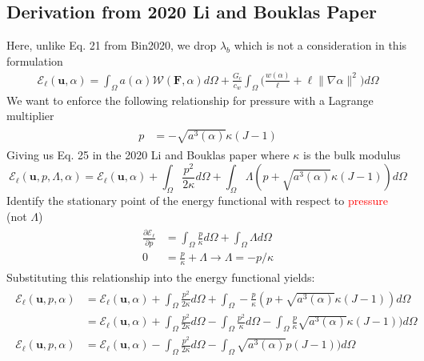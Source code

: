 \documentclass[12pt,3p]{article}
\numberwithin{equation}{section}
\begin{document}
\subsection{Derivation from 2020 Li and Bouklas Paper}
Here, unlike Eq. 21 from Bin2020, we drop $\lambda_b$ which is not a consideration in this formulation
\begin{align}
\mathcal{E}_{\ell}(\boldsymbol{u}, \alpha) = \int_{\Omega} a(\alpha) \mathcal{W}(\mathbf{F}, \alpha) d \Omega+\frac{G_{c}}{c_{w}} \int_{\Omega} \bigg(\frac{w(\alpha)}{\ell}+\ell\|\nabla \alpha\|^{2} \bigg) d \Omega 
\end{align}
We want to enforce the following relationship for pressure with a Lagrange multiplier
\begin{align}\label{eq_pressure}
\begin{split}
p &= - \sqrt{a^3 (\alpha)} \kappa \left(J-1\right) 
\end{split}
\end{align}
Giving us Eq. 25 in the 2020 Li and Bouklas paper where $\kappa$ is the bulk modulus 
\begin{equation}
\mathcal{E}_{\ell}\left(\boldsymbol{u}, p, \Lambda, \alpha\right) = \mathcal{E}_{\ell} (\boldsymbol{u}, \alpha ) + \int_{\Omega} \frac{p^{2}}{2 \kappa} d \Omega +\int_{\Omega} \Lambda(p+\sqrt{a^{3}(\alpha)} \kappa (J-1)) d \Omega
\end{equation}
Identify the stationary point of the energy functional with respect to \textcolor{red}{pressure} (not $\Lambda$)
\begin{align*}
\begin{split}
\frac{\partial \mathcal{E}_{\ell}}{\partial p} &= \int_{\Omega} \frac{p}{\kappa} d \Omega + \int_{\Omega} \Lambda d \Omega \\
0 &= \frac{p}{\kappa} + \Lambda \rightarrow \Lambda = -p/\kappa 
\end{split}
\end{align*}
Substituting this relationship into the energy functional yields: 
\begin{align}
\begin{split}
\mathcal{E}_{\ell}\left(\boldsymbol{u}, p, \alpha\right) &= \mathcal{E}_{\ell} (\boldsymbol{u}, \alpha ) + \int_{\Omega} \frac{p^{2}}{2 \kappa} d \Omega +\int_{\Omega} - \frac{p}{\kappa} (p+\sqrt{a^{3}(\alpha)} \kappa (J-1)) d \Omega \\
		&= \mathcal{E}_{\ell} (\boldsymbol{u}, \alpha ) + \int_{\Omega} \frac{p^{2}}{2 \kappa} d \Omega -\int_{\Omega} \frac{p^2}{\kappa} d \Omega - \int_{\Omega} \frac{p}{\kappa} \sqrt{a^{3}(\alpha)} \kappa (J-1)) d \Omega \\
\mathcal{E}_{\ell}\left(\boldsymbol{u}, p, \alpha\right) &= \mathcal{E}_{\ell} (\boldsymbol{u}, \alpha ) - \int_{\Omega} \frac{p^{2}}{2 \kappa} d \Omega - \int_{\Omega} \sqrt{a^{3}(\alpha)} p(J-1)) d \Omega
\end{split}
\end{align}
\end{document}
